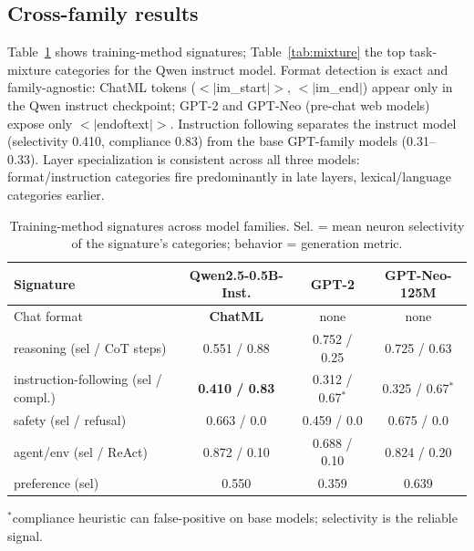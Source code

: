 \documentclass[11pt]{article}
\begin{document}
\subsection{Cross-family results}
Table~\ref{tab:sigs} shows training-method signatures; Table~\ref{tab:mixture} the top
task-mixture categories for the Qwen instruct model. Format detection is exact and
family-agnostic: ChatML tokens ($<|$im\_start$|>$, $<|$im\_end$|$) appear only in the
Qwen instruct checkpoint; GPT-2 and GPT-Neo (pre-chat web models) expose only
$<|$endoftext$|>$. Instruction following separates the instruct model (selectivity
0.410, compliance 0.83) from the base GPT-family models (0.31--0.33). Layer
specialization is consistent across all three models: format/instruction categories
fire predominantly in late layers, lexical/language categories earlier.

\begin{table}[h]
\centering
\caption{Training-method signatures across model families. Sel. = mean neuron
selectivity of the signature's categories; behavior = generation metric.}
\label{tab:sigs}
\begin{tabular}{lccc}
\toprule
Signature & Qwen2.5-0.5B-Inst. & GPT-2 & GPT-Neo-125M \\
\midrule
Chat format & \textbf{ChatML} & none & none \\
reasoning (sel / CoT steps) & 0.551 / 0.88 & 0.752 / 0.25 & 0.725 / 0.63 \\
instruction-following (sel / compl.) & \textbf{0.410 / 0.83} & 0.312 / 0.67$^*$ & 0.325 / 0.67$^*$ \\
safety (sel / refusal) & 0.663 / 0.0 & 0.459 / 0.0 & 0.675 / 0.0 \\
agent/env (sel / ReAct) & 0.872 / 0.10 & 0.688 / 0.10 & 0.824 / 0.20 \\
preference (sel) & 0.550 & 0.359 & 0.639 \\
\bottomrule
\end{tabular}

\small $^*$compliance heuristic can false-positive on base models; selectivity is the
reliable signal.
\end{table}
\end{document}
